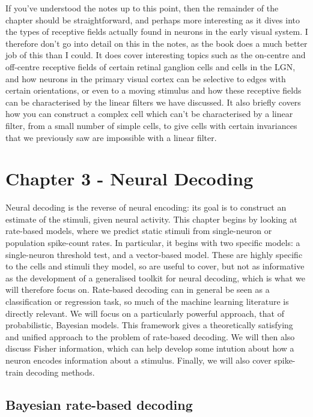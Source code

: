 \documentclass{article}
\begin{document}
If you've understood the notes up to this point, then the remainder of the chapter should be straightforward, and perhaps more interesting as it dives into the types of receptive fields actually found in neurons in the early visual system. I therefore don't go into detail on this in the notes, as the book does a much better job of this than I could. It does cover interesting topics such as the on-centre and off-centre receptive fields of certain retinal ganglion cells and cells in the LGN, and how neurons in the primary visual cortex can be selective to edges with certain orientations, or even to a moving stimulus and how these receptive fields can be characterised by the linear filters we have discussed. It also briefly covers how you can construct a complex cell which can't be characterised by a linear filter, from a small number of simple cells, to give cells with certain invariances that we previously saw are impossible with a linear filter.\\

\section{Chapter 3 - Neural Decoding}

Neural decoding is the reverse of neural encoding: its goal is to construct an estimate of the stimuli, given neural activity. This chapter begins by looking at rate-based models, where we predict static stimuli from single-neuron or population spike-count rates. In particular, it begins with two specific models: a single-neuron threshold test, and a vector-based model. These are highly specific to the cells and stimuli they model, so are useful to cover, but not as informative as the development of a generalised toolkit for neural decoding, which is what we will therefore focus on. Rate-based decoding can in general be seen as a classification or regression task, so much of the machine learning literature is directly relevant. We will focus on a particularly powerful approach, that of probabilistic, Bayesian models. This framework gives a theoretically satisfying and unified approach to the problem of rate-based decoding. We will then also discuss Fisher information, which can help develop some intution about how a neuron encodes information about a stimulus. Finally, we will also cover spike-train decoding methods.

\subsection{Bayesian rate-based decoding}
\end{document}
